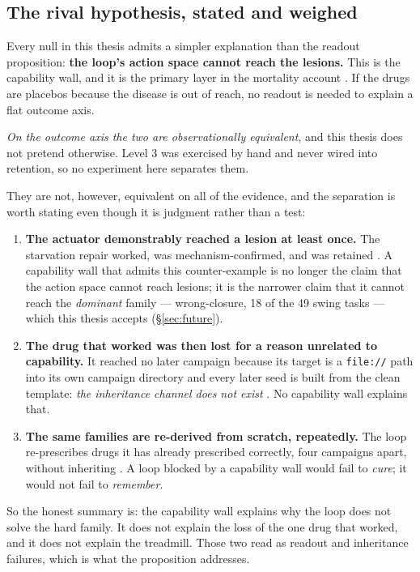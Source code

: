 \subsection*{The rival hypothesis, stated and weighed}

Every null in this thesis admits a simpler explanation than the readout
proposition: \textbf{the loop's action space cannot reach the lesions.}
This is the capability wall, and it is the primary layer in the mortality
account . If the drugs are placebos because the disease is out of
reach, no readout is needed to explain a flat outcome axis.

\emph{On the outcome axis the two are observationally equivalent}, and this
thesis does not pretend otherwise. Level 3 was exercised by hand
 and never wired into retention, so no experiment here
separates them.

They are not, however, equivalent on all of the evidence, and the
separation is worth stating even though it is  judgment rather than
a test:

\begin{enumerate}
  \item \textbf{The actuator demonstrably reached a lesion at least once.}
        The starvation repair worked, was mechanism-confirmed, and was
        retained . A capability wall that admits this counter-example
        is no longer the claim that the action space cannot reach lesions;
        it is the narrower claim that it cannot reach the \emph{dominant}
        family --- wrong-closure, 18 of the 49 swing tasks  --- which
        this thesis accepts (\S\ref{sec:future}).
  \item \textbf{The drug that worked was then lost for a reason unrelated
        to capability.} It reached no later campaign because its target is
        a \texttt{file://} path into its own campaign directory and every
        later seed is built from the clean template: \emph{the inheritance
        channel does not exist} . No capability wall explains that.
  \item \textbf{The same families are re-derived from scratch, repeatedly.}
        The loop re-prescribes drugs it has already prescribed correctly,
        four campaigns apart, without inheriting . A loop blocked by
        a capability wall would fail to \emph{cure}; it would not fail to
        \emph{remember}.
\end{enumerate}

So the honest summary is: the capability wall explains why the loop does
not solve the hard family. It does not explain the loss of the one drug
that worked, and it does not explain the treadmill. Those two read as
readout and inheritance failures, which is what the proposition
addresses.

